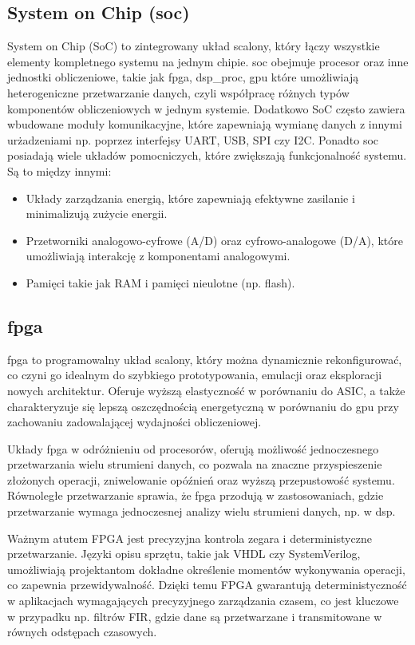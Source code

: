 \subsection{System on Chip (\ac{soc})}
System on Chip (SoC) to zintegrowany układ scalony, który łączy wszystkie elementy kompletnego systemu na jednym chipie. \ac{soc} obejmuje procesor oraz inne jednostki obliczeniowe, takie jak \ac{fpga},
\ac{dsp_proc}, \ac{gpu} które umożliwiają heterogeniczne przetwarzanie danych, czyli współpracę różnych typów komponentów obliczeniowych w jednym systemie. Dodatkowo SoC często zawiera wbudowane moduły komunikacyjne, które zapewniają wymianę danych z innymi urżadzeniami np. poprzez interfejsy UART, USB, SPI czy I2C.  Ponadto \ac{soc} posiadają wiele układów pomocniczych, które zwiększają funkcjonalność systemu. Są to między innymi:
\begin{itemize}
    \item Układy zarządzania energią, które zapewniają efektywne zasilanie i minimalizują zużycie energii.
    \item Przetworniki analogowo-cyfrowe (A/D) oraz cyfrowo-analogowe (D/A), które umożliwiają interakcję z komponentami analogowymi.
    \item Pamięci takie jak RAM i pamięci nieulotne (np. flash).
\end{itemize}

\subsection{\ac{fpga}}
\ac{fpga} to programowalny układ scalony, który można dynamicznie rekonfigurować, co czyni go idealnym do szybkiego prototypowania, emulacji oraz eksploracji nowych architektur. Oferuje wyższą elastyczność w porównaniu do ASIC, a także charakteryzuje się lepszą oszczędnością energetyczną w porównaniu do \ac{gpu} przy zachowaniu zadowalającej wydajności obliczeniowej.

Układy \ac{fpga} w odróżnieniu od procesorów, oferują możliwość jednoczesnego przetwarzania wielu strumieni danych, co pozwala na znaczne przyspieszenie złożonych operacji, zniwelowanie opóźnień oraz wyższą przepustowość systemu. Równoległe przetwarzanie sprawia, że \ac{fpga} przodują w zastosowaniach, gdzie przetwarzanie wymaga jednoczesnej analizy wielu strumieni danych, np. w \ac{dsp}.

Ważnym atutem FPGA jest precyzyjna kontrola zegara i deterministyczne przetwarzanie. Języki opisu sprzętu, takie jak VHDL czy SystemVerilog, umożliwiają projektantom dokładne określenie momentów wykonywania operacji, co zapewnia przewidywalność. Dzięki temu FPGA gwarantują deterministyczność w aplikacjach wymagających precyzyjnego zarządzania czasem, co jest kluczowe w przypadku np. filtrów FIR, gdzie dane są przetwarzane i transmitowane w równych odstępach czasowych.

